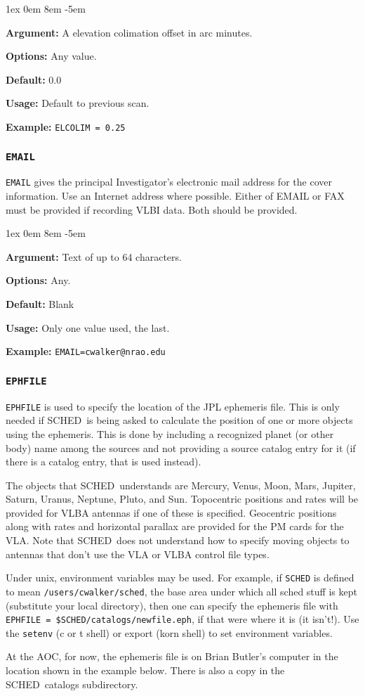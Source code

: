 \documentclass{report}
\newcommand{\schedb}{{\sc SCHED~}}
\newcommand{\rcwbox}[5]{
  \begin{list}{}{\parsep 1ex  \itemsep 0em
                 \leftmargin 8em  \itemindent -5em }
    \item {\bf Argument:} #1
    \item {\bf Options:}  #2
    \item {\bf Default:}  #3
    \item {\bf Usage:}    #4
    \item {\bf Example:}  #5
  \end{list}
}
\begin{document}
\rcwbox
{A elevation colimation offset in arc minutes.}
{Any value.}
{0.0}
{Default to previous scan.}
{{\tt ELCOLIM = 0.25 }}



\subsubsection{\label{MP:EMAIL}{\tt EMAIL}}

{\tt EMAIL} gives the principal Investigator's electronic mail
address for the cover information.  Use an Internet address where
possible.  Either of EMAIL or FAX must be provided if recording
VLBI data.  Both should be provided.

\rcwbox
{Text of up to 64 characters.}
{Any.}
{Blank}
{Only one value used, the last.}
{{\tt EMAIL=cwalker@nrao.edu}}

\subsubsection{\label{MP:EPHFILE}{\tt EPHFILE}}

{\tt EPHFILE} is used to specify the location of the JPL ephemeris
file.  This is only needed if \schedb is being asked to calculate
the position of one or more objects using the ephemeris.  This is
done by including a recognized planet (or other body) name among
the sources and not providing a source catalog entry for it (if there
is a catalog entry, that is used instead).

The objects that \schedb understands are Mercury, Venus, Moon, Mars,
Jupiter, Saturn, Uranus, Neptune, Pluto, and Sun.  Topocentric
positions and rates will be provided for VLBA antennas if one of
these is specified.  Geocentric positions along with rates and
horizontal parallax are provided for the PM cards for the VLA.
Note that \schedb does not understand how to specify moving objects
to antennas that don't use the VLA or VLBA control file types.

Under unix, environment variables may be used.  For example, if
{\tt SCHED} is defined to mean {\tt /users/cwalker/sched}, the
base area under which all sched stuff is kept (substitute your
local directory), then one can specify the ephemeris file with
{\tt EPHFILE = \$SCHED/catalogs/newfile.eph}, if that were where
it is (it isn't!).  Use the {\tt setenv}
(c or t shell) or export (korn shell) to set environment variables.

At the AOC, for now, the ephemeris file is on Brian Butler's
computer in the location shown in the example below.  There is
also a copy in the \schedb catalogs subdirectory.
\end{document}
